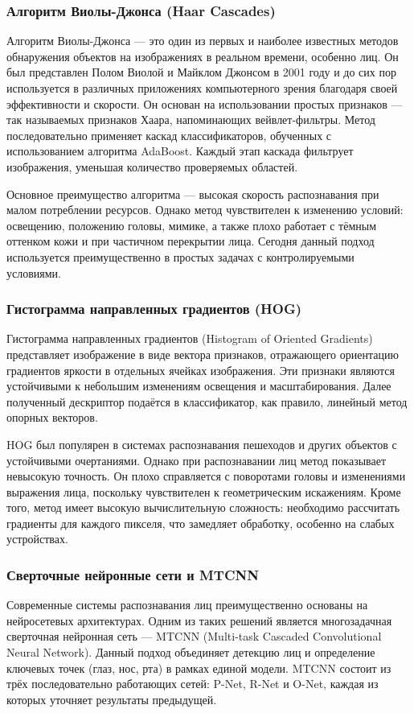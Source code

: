 \subsubsection{Алгоритм Виолы-Джонса (Haar Cascades)}
Алгоритм Виолы-Джонса — это один из первых и наиболее известных методов обнаружения объектов на изображениях в реальном времени, особенно лиц. Он был представлен Полом Виолой и Майклом Джонсом в 2001 году и до сих пор используется в различных приложениях компьютерного зрения благодаря своей эффективности и скорости. Он основан на использовании простых признаков — так называемых признаков Хаара, напоминающих вейвлет-фильтры. Метод последовательно применяет каскад классификаторов, обученных с использованием алгоритма AdaBoost. Каждый этап каскада фильтрует изображения, уменьшая количество проверяемых областей.

Основное преимущество алгоритма — высокая скорость распознавания при малом потреблении ресурсов. Однако метод чувствителен к изменению условий: освещению, положению головы, мимике, а также плохо работает с тёмным оттенком кожи и при частичном перекрытии лица. Сегодня данный подход используется преимущественно в простых задачах с контролируемыми условиями.

\subsubsection{Гистограмма направленных градиентов (HOG)}
Гистограмма направленных градиентов (Histogram of Oriented Gradients) представляет изображение в виде вектора признаков, отражающего ориентацию градиентов яркости в отдельных ячейках изображения. Эти признаки являются устойчивыми к небольшим изменениям освещения и масштабирования. Далее полученный дескриптор подаётся в классификатор, как правило, линейный метод опорных векторов.

HOG был популярен в системах распознавания пешеходов и других объектов с устойчивыми очертаниями. Однако при распознавании лиц метод показывает невысокую точность. Он плохо справляется с поворотами головы и изменениями выражения лица, поскольку чувствителен к геометрическим искажениям. Кроме того, метод имеет высокую вычислительную сложность: необходимо рассчитать градиенты для каждого пикселя, что замедляет обработку, особенно на слабых устройствах.

\subsubsection{Сверточные нейронные сети и MTCNN}
Современные системы распознавания лиц преимущественно основаны на нейросетевых архитектурах. Одним из таких решений является многозадачная сверточная нейронная сеть — MTCNN (Multi-task Cascaded Convolutional Neural Network). Данный подход объединяет детекцию лиц и определение ключевых точек (глаз, нос, рта) в рамках единой модели. MTCNN состоит из трёх последовательно работающих сетей: P-Net, R-Net и O-Net, каждая из которых уточняет результаты предыдущей.

